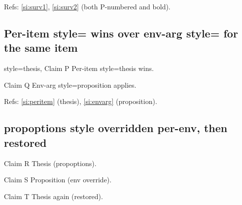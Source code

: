 \documentclass{article}
\begin{document}
\begin{prop}[style=proposition, counter=P]
  \item \label{si:surv1}  %
  \item \label{si:surv2}  %
\end{prop}

Refs: \ref{si:surv1}, \ref{si:surv2} (both P-numbered and bold).

\subsection{Per-item style= wins over env-arg style= for the same item}


\begin{prop}[style=proposition]
  \item[style=thesis, Claim P]
    Per-item style=thesis wins.  \label{si:peritem}
  \item[Claim Q]
    Env-arg style=proposition applies.  \label{si:envarg}
\end{prop}

Refs: \ref{si:peritem} (thesis), \ref{si:envarg} (proposition).

\subsection{propoptions style overridden per-env, then restored}



\begin{prop}
  \item[Claim R] Thesis (propoptions). \label{si:restore1}
\end{prop}
\begin{prop}[style=proposition]
  \item[Claim S] Proposition (env override). \label{si:restore2}
\end{prop}
\begin{prop}
  \item[Claim T] Thesis again (restored). \label{si:restore3}
\end{prop}
\end{document}
